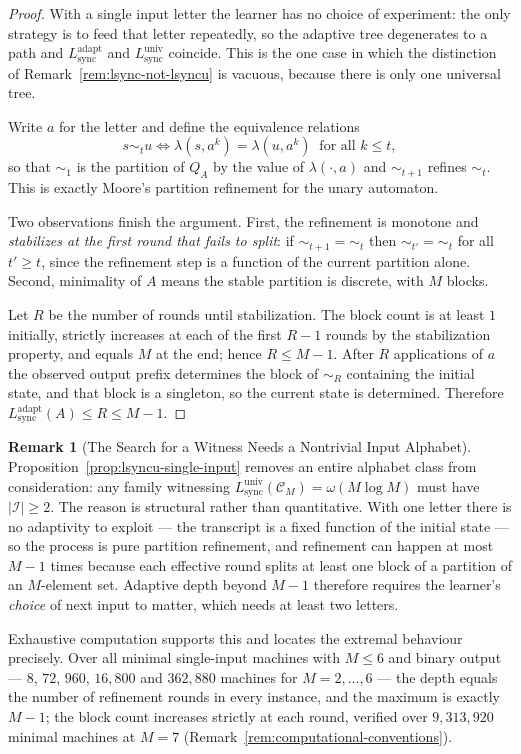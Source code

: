 \documentclass[12pt]{article}
\theoremstyle{definition}
\newtheorem{remark}[theorem]{Remark}
\newcommand{\Lsync}{L_{\mathrm{sync}}^{\mathrm{adapt}}}
\newcommand{\Lsyncu}{L_{\mathrm{sync}}^{\mathrm{univ}}}
\begin{document}
\begin{proof}
With a single input letter the learner has no choice of experiment: the only
strategy is to feed that letter repeatedly, so the adaptive tree degenerates to
a path and $\Lsync$ and $\Lsyncu$ coincide.  This is the one case in which the
distinction of Remark~\ref{rem:lsync-not-lsyncu} is vacuous, because there is
only one universal tree.

Write $a$ for the letter and define the equivalence relations
\[
s\sim_t u
\iff
\lambda(s,a^k)=\lambda(u,a^k)\ \text{ for all } k\le t ,
\]
so that $\sim_1$ is the partition of $Q_A$ by the value of $\lambda(\cdot,a)$
and $\sim_{t+1}$ refines $\sim_t$.  This is exactly Moore's partition
refinement for the unary automaton.

Two observations finish the argument.  First, the refinement is monotone and
\emph{stabilizes at the first round that fails to split}: if
$\sim_{t+1}=\sim_t$ then $\sim_{t'}=\sim_t$ for all $t'\ge t$, since the
refinement step is a function of the current partition alone.  Second,
minimality of $A$ means the stable partition is discrete, with $M$ blocks.

Let $R$ be the number of rounds until stabilization.  The block count is at
least $1$ initially, strictly increases at each of the first $R-1$ rounds by
the stabilization property, and equals $M$ at the end; hence $R\le M-1$.  After
$R$ applications of $a$ the observed output prefix determines the block of
$\sim_R$ containing the initial state, and that block is a singleton, so the
current state is determined.  Therefore
$L_{\mathrm{sync}}^{\mathrm{adapt}}(A)\le R\le M-1$.
\end{proof}

\begin{remark}[The Search for a Witness Needs a Nontrivial Input Alphabet]
\label{rem:witness-needs-two-inputs}
Proposition~\ref{prop:lsyncu-single-input} removes an entire alphabet class
from consideration: any family witnessing
$\Lsyncu(\mathcal C_M)=\omega(M\log M)$ must have $|\mathcal I|\ge2$.  The
reason is structural rather than quantitative.  With one letter there is no
adaptivity to exploit --- the transcript is a fixed function of the initial
state --- so the process is pure partition refinement, and refinement can
happen at most $M-1$ times because each effective round splits at least one
block of a partition of an $M$-element set.  Adaptive depth beyond $M-1$
therefore requires the learner's \emph{choice} of next input to matter, which
needs at least two letters.

Exhaustive computation supports this and locates the extremal behaviour
precisely.  Over all minimal single-input machines with $M\le6$ and binary
output --- $8$, $72$, $960$, $16{,}800$ and $362{,}880$ machines for
$M=2,\dots,6$ --- the depth equals the number of refinement rounds in every
instance, and the maximum is exactly $M-1$; the block count increases strictly
at each round, verified over $9{,}313{,}920$ minimal machines at $M=7$
(Remark~\ref{rem:computational-conventions}).
\end{remark}
\end{document}
